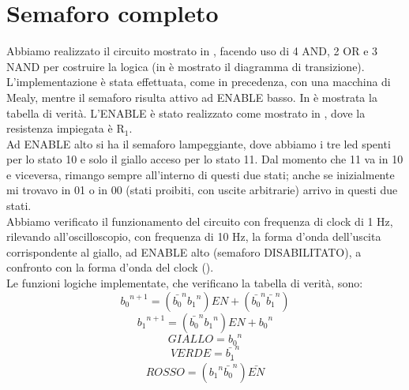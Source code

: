\section{Semaforo completo}
Abbiamo realizzato il circuito mostrato in , facendo uso di 4 AND, 2 OR e 3 NAND per costruire la logica (in  è mostrato il diagramma di transizione). L'implementazione è stata effettuata, come in precedenza, con una macchina di Mealy, mentre il semaforo risulta attivo ad ENABLE basso. In  è mostrata la tabella di verità. L'ENABLE è stato realizzato come mostrato in , dove la resistenza impiegata è R$_1$.\\ %
Ad ENABLE alto si ha il semaforo lampeggiante, dove abbiamo i tre led spenti per lo stato 10 e solo il giallo acceso per lo stato 11. Dal momento che 11 va in 10 e viceversa, rimango sempre all'interno di questi due stati; anche se inizialmente mi trovavo in 01 o in 00 (stati proibiti, con uscite arbitrarie) arrivo in questi due stati.\\
Abbiamo verificato il funzionamento del circuito con frequenza di clock di 1 Hz, rilevando all'oscilloscopio, con frequenza di 10 Hz, la forma d'onda dell'uscita corrispondente al giallo, ad ENABLE alto (semaforo DISABILITATO), a confronto con la forma d'onda del clock ().\\
Le funzioni logiche implementate, che verificano la tabella di verità, sono:
\begin{equation}
{b_0}^{n+1} = ({\bar{b_0}}^{n} {b_1}^{n}) EN + ({\bar{b_0}}^{n} {\bar{b_1}}^{n})
\label{e:eq1}
\end{equation}
\begin{equation}
{b_1}^{n+1} = ({\bar{b_0}}^{n} {b_1}^{n}) EN + {b_0}^{n}
\label{e:eq2}
\end{equation}
\begin{equation}
GIALLO = {b_0}^{n}
\label{e:eq3}
\end{equation}
\begin{equation}
VERDE = {\bar{b_1}}^{n}
\label{e:eq4}
\end{equation}
\begin{equation}
ROSSO = \bar{({b_1}^{n} {\bar{b_0}}^{n}) \bar{EN}}
\label{e:eq5}
\end{equation}



